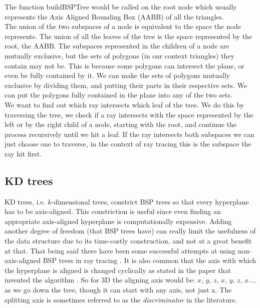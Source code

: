 \documentclass[12pt]{article}
\begin{document}
The function buildBSPTree would be called on the root node which usually represents the Axis Aligned Bounding Box (AABB) of all the triangles. \\
\indent The union of the two subspaces of a node is equivalent to the space the node represents. The union of all the leaves of the tree is the space represented by the root, the AABB. The subspaces represented in the children of a node are mutually exclusive, but the sets of polygons (in our context triangles) they contain may not be. This is because some polygons can intersect the plane, or even be fully contained by it. We can make the sets of polygons mutually exclusive by dividing them, and putting their parts in their respective sets. We can put the polygons fully contained in the plane into any of the two sets.\\
\indent We want to find out which ray intersects which leaf of the tree. We do this by traversing the tree, we check if a ray intersects with the space represented by the left or by the right child of a node, starting with the root, and continue the process recursively until we hit a leaf. If the ray intersects both subspaces we can just choose one to traverse, in the context of ray tracing this is the subspace the ray hit first.

\subsection{KD trees}
KD trees, i.e. $k$-dimensional trees, constrict BSP trees so that every hyperplane has to be axis-aligned. This constriction is useful since even finding an appropriate axis-aligned hyperplane is computationally expensive. Adding another degree of freedom (that BSP trees have) can really limit the usefulness of the data structure due to its time-costly construction, and not at a great benefit at that. That being said there have been some successful attempts at using non-axis-aligned BSP trees in ray tracing \cite{ize2008ray}. It is also common that the axis with which the hyperplane is aligned is changed cyclically as stated in the paper that invented the algorithm \cite{bentley1975multidimensional}. So for 3D the aligning axis would be: $x$, $y$, $z$, $x$, $y$, $z$, $x$.... as we go down the tree, though it can start with any axis, not just x. The splitting axis is sometimes referred to as the \textit{discriminator} in the literature.
\end{document}
